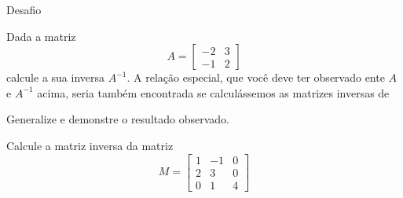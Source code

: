 \begin{exercicios}{Desafio}
    \begin{exercicio}
        Dada a matriz 
        \[A = \left[\begin{array}{cc}
        -2 & 3 \\
        -1 & 2
        \end{array} \right]\]
        calcule a sua inversa $A^{-1}$. 
        A relação especial, que você deve ter observado ente $A$ e $A^{-1}$ acima, 
        seria também encontrada se calculássemos as matrizes inversas de
        \begin{mathlist}
            \item \left[\begin{array}{rr}
                -3 & 4 \\ 
                -2 & 3
            \end{array} \right]
            \item \left[\begin{array}{rr}
                -5 & 6 \\ 
                -4 & 5
            \end{array} \right]
            \item \left[\begin{array}{rr}
                -1 & 2 \\
                0 & 1
            \end{array} \right]
        \end{mathlist}
        Generalize e demonstre o resultado observado.
    \end{exercicio}
    
    \begin{exercicio}
        Calcule a matriz inversa da matriz
        \[M = \left[\begin{array}{rrr}
        1 & -1 & 0 \\
        2 &  3 & 0 \\
        0 &  1 & 4
        \end{array} \right]\]
    \end{exercicio}
    
\end{exercicios}

